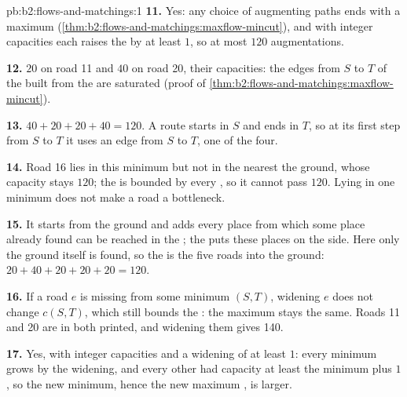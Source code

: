 \begin{solution}{pb:b2:flows-and-matchings:1}
\textbf{11.} Yes: any choice of augmenting paths ends with a maximum  (\cref{thm:b2:flows-and-matchings:maxflow-mincut}),
and with integer capacities each raises the  by at least $1$, so at most $120$ augmentations.

\textbf{12.} $20$ on road 11 and $40$ on road 20, their capacities: the edges from $S$ to $T$ of the  built from the
 are saturated (proof of \cref{thm:b2:flows-and-matchings:maxflow-mincut}).

\textbf{13.} $40 + 20 + 20 + 40 = 120$. A route starts in $S$ and ends in $T$, so at its first step from $S$ to $T$ it
uses an edge from $S$ to $T$, one of the four.

\textbf{14.} Road 16 lies in this minimum  but not in the  nearest the ground, whose capacity stays $120$; the
 is bounded by every , so it cannot pass $120$. Lying in one minimum  does not make a road a bottleneck.

\textbf{15.} It starts from the ground and adds every place from which some place already found can be reached in the
; the  puts these places on the  side. Here only the ground itself is found, so the  is the
five roads into the ground: $20 + 40 + 20 + 20 + 20 = 120$.

\textbf{16.} If a road $e$ is missing from some minimum  $(S, T)$, widening $e$ does not change $c(S, T)$, which still
bounds the : the maximum stays the same. Roads 11 and 20 are in both  printed, and widening them gives 140.

\textbf{17.} Yes, with integer capacities and a widening of at least $1$: every minimum  grows by the widening, and
every other  had capacity at least the minimum plus $1$, so the new minimum, hence the new maximum , is larger.


\end{solution}
